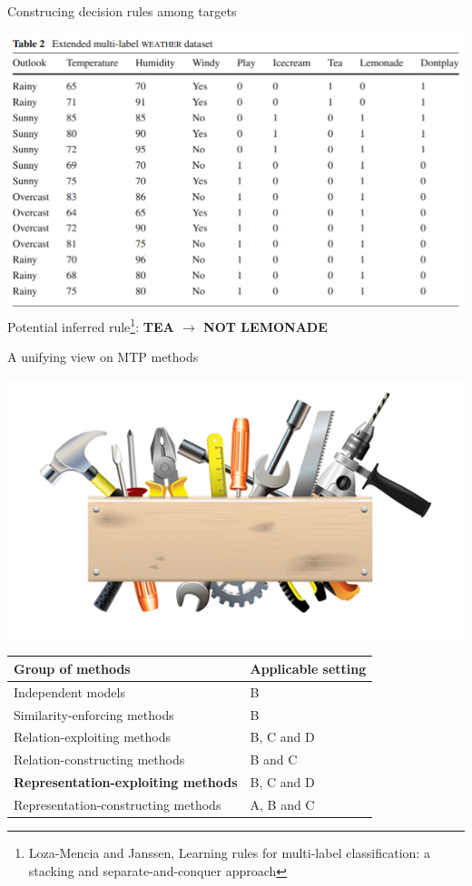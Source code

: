 \documentclass[]{beamer}
\renewcommand{\alert}[1]{\textbf{\color{putblue} #1}}
\begin{document}
\begin{frame}{Construcing decision rules among targets}
\begin{center}
\includegraphics[scale=0.3]{Figures/rules} \\ \pause 
Potential inferred rule\footnote{Loza-Mencia and Janssen, Learning rules for multi-label classification: a stacking and separate-and-conquer approach}: \alert{TEA $\rightarrow$ NOT LEMONADE} \\

\vspace{0.3cm}
\end{center}

\end{frame}


\begin{frame}{A unifying view on MTP methods}

\begin{center}
\includegraphics[scale=0.3]{pics/tools}

\begin{tabular}{ll}
\hline
Group of methods & Applicable setting \\
\hline
\hline
Independent models & B \\
Similarity-enforcing methods & B   \\ 
Relation-exploiting methods & B, C and D  \\
Relation-constructing methods & B and C \\
\alert{Representation-exploiting methods} & B, C and D \\
Representation-constructing methods & A, B and C \\
\hline  
\end{tabular}
\end{center}
\end{frame}
\end{document}
